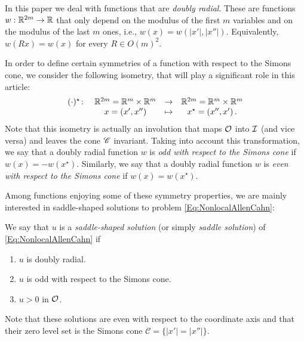 In this paper we deal with functions that are \emph{doubly radial}. These are functions $w:\mathbb{R}^{2m}  \to \mathbb{R}$ that only depend on the modulus of the first $m$ variables and on the modulus of the last $m$ ones, i.e., $w(x) = w(|x'|,|x''|)$. Equivalently, $w(Rx) = w(x)$ for every $R \in O(m)^2$.

In order to define certain symmetries of a function with respect to the Simons cone, we consider the following isometry, that will play a significant role in this article:
\begin{equation}
\label{Eq:DefStar}
\begin{matrix}
(\cdot)^\star \colon & \mathbb{R}^{2m}= \mathbb{R}^{m}\times \mathbb{R}^{m}  &\to&  \mathbb{R}^{2m}= \mathbb{R}^{m}\times \mathbb{R}^{m}  \\
& x = (x',x'') &\mapsto & x^\star = (x'',x')\,.
\end{matrix}
\end{equation}
Note that this isometry is actually an involution that maps $\mathcal{O}$ into $\mathcal{I}$ (and vice versa) and leaves the cone $\mathscr{C}$ invariant. Taking into account this transformation, we say that a doubly radial function $w$ is \emph{odd with respect to the Simons cone} if $w(x) = -w(x^\star)$. Similarly, we say that a doubly radial function $w$ is \emph{even with respect to the Simons cone} if $w(x) = w(x^\star)$.


Among functions enjoying some of these symmetry properties, we are mainly interested in saddle-shaped solutions to problem \eqref{Eq:NonlocalAllenCahn}:
\begin{definition}
	\label{Def:SaddleShapedSol}
	We say that $u$ is a \emph{saddle-shaped solution} (or simply \emph{saddle solution}) of \eqref{Eq:NonlocalAllenCahn} if
	\begin{enumerate}
		\item $u$ is doubly radial.
		\item $u$ is odd with respect to the Simons cone.
		\item $u > 0$ in $\mathcal{O}$.
	\end{enumerate}
\end{definition}


Note that these solutions are even with respect to the coordinate axis and that their zero level set is the Simons cone $\mathscr{C} = \{|x'|=|x''|\}$. 






%

